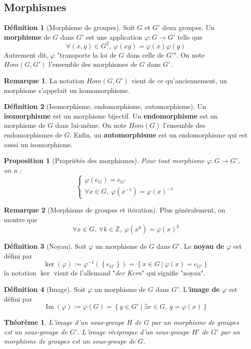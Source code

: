 \documentclass[french]{book}
\newcommand{\Z}{\mathbb{Z}}
\newcommand{\inv}{^{-1}}
\theoremstyle{plain}
\newtheorem{thm}{Théorème}[chapter]
\newtheorem{prop}{Proposition}[chapter]
\theoremstyle{definition}
\newtheorem{dfn}{Définition}[chapter]
\newtheorem{rmq}{Remarque}[chapter]
\theoremstyle{remark}
\DeclareMathOperator{\im}{Im}
\begin{document}
\subsection{Morphismes}
\begin{dfn}[Morphisme de groupes]
	Soit $G$ et $G'$ deux groupes. Un \textbf{morphisme} de $G$ dans $G'$ est une application $\varphi:G\rightarrow G'$ telle que $$\forall(x,y)\in G^2,\ \varphi(xy)=\varphi(x)\varphi(y)$$ Autrement dit, $\varphi$ "transporte la loi de $G$ dans celle de $G'$". On note $Hom(G,G')$ l'ensemble des morphismes de $G$ dans $G'$.
\end{dfn}
\begin{rmq}
	La notation $Hom(G,G')$ vient de ce qu'anciennement, un morphisme s'appelait un homomorphisme.
\end{rmq}
\begin{dfn}[Isomorphisme, endomorphisme, automorphisme]
	Un \textbf{isomorphisme} est un morphisme bijectif. Un \textbf{endomorphisme} est un morphisme de $G$ dans lui-même. On note $Hom(G)$ l'ensemble des endomorphismes de $G$. Enfin, un \textbf{automorphisme} est un endomorphisme qui est aussi un isomorphisme.
\end{dfn}
\begin{prop}[Propriétés des morphismes]
	Pour tout morphisme $\varphi:G\rightarrow G'$, on a : $$\left \{ \begin{array}{ll}\varphi(e_G)=e_{G'}\\ \forall x\in G,\ \varphi(x\inv)=\varphi(x)\inv\end{array}\right.$$
\end{prop}
\begin{rmq}[Morphisme de groupes et itération]
	Plus généralement, on montre que $$\forall x\in G,\ \forall k\in\Z,\ \varphi\left(x^k\right)=\varphi(x)^k$$
\end{rmq}
\begin{dfn}[Noyau]
	Soit $\varphi$ un morphisme de $G$ dans $G'$. Le \textbf{noyau de $\varphi$} est défini par $$\ker(\varphi):=\varphi\inv\left(\left\{e_{G'}\right\}\right)=\left\{x\in G\ | \ \varphi(x)=e_{G'}\right\}$$ la notation $\ker$ vient de l'allemand "\textit{der Kern}" qui signifie "noyau".
\end{dfn}
\begin{dfn}[Image]
	Soit $\varphi$ un morphisme de $G$ dans $G'$. L'\textbf{image de $\varphi$} est défini par $$\im(\varphi):=\varphi(G)=\left\{y\in G'\ | \ \exists x\in G,\ y=\varphi(x)\right\}$$
\end{dfn}
\begin{thm}
	L'image d'un sous-groupe $H$ de $G$ par un morphisme de groupes est un sous-groupe de $G'$. L'image réciproque d'un sous-groupe $H'$ de $G'$ par un morphisme de groupes est un sous-groupe de $G$.
\end{thm}
\end{document}
